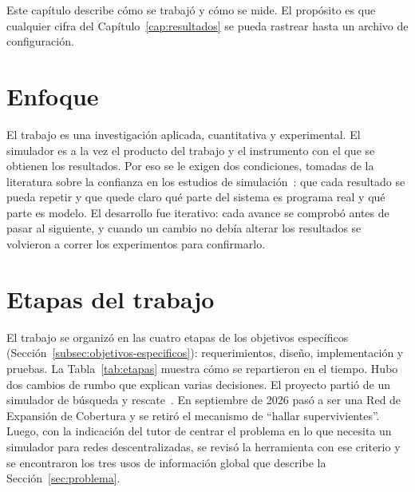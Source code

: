 
Este capítulo describe cómo se trabajó y cómo se mide. El propósito es que
cualquier cifra del Capítulo~\ref{cap:resultados} se pueda rastrear hasta un
archivo de configuración.

\section{Enfoque}
\label{sec:enfoque}

El trabajo es una investigación aplicada, cuantitativa y experimental. El
simulador es a la vez el producto del trabajo y el instrumento con el que se
obtienen los resultados. Por eso se le exigen dos condiciones, tomadas de la
literatura sobre la confianza en los estudios de
simulación~\cite{Pawlikowski2002Credibility,Kurkowski2005Incredibles}: que cada
resultado se pueda repetir y que quede claro qué parte del sistema es programa
real y qué parte es modelo. El desarrollo fue iterativo: cada avance se
comprobó antes de pasar al siguiente, y cuando un cambio no debía alterar los
resultados se volvieron a correr los experimentos para confirmarlo.

\section{Etapas del trabajo}
\label{sec:etapas}

El trabajo se organizó en las cuatro etapas de los objetivos específicos
(Sección~\ref{subsec:objetivos-especificos}): requerimientos, diseño,
implementación y pruebas. La Tabla~\ref{tab:etapas} muestra cómo se repartieron
en el tiempo. Hubo dos cambios de rumbo que explican varias decisiones. El
proyecto partió de un simulador de búsqueda y
rescate~\cite{JofsanchezciSimulador}. En septiembre de 2026 pasó a ser una Red
de Expansión de Cobertura y se retiró el mecanismo de ``hallar supervivientes''.
Luego, con la indicación del tutor de centrar el problema en lo que necesita un
simulador para redes descentralizadas, se revisó la herramienta con ese
criterio y se encontraron los tres usos de información global que describe la
Sección~\ref{sec:problema}.

